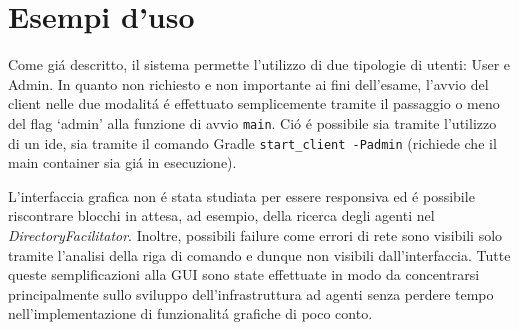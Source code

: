 \section{Esempi d’uso}


Come gi\'a descritto, il sistema permette l'utilizzo di due tipologie di utenti: User e Admin. In quanto non richiesto e non importante ai fini dell'esame, l'avvio del client nelle due modalit\'a \'e effettuato semplicemente tramite il passaggio o meno del flag `admin' alla funzione di avvio \texttt{main}. Ci\'o \'e possibile sia tramite l'utilizzo di un ide, sia tramite il comando Gradle \texttt{start\_client -Padmin} (richiede che il main container sia gi\'a in esecuzione).

L'interfaccia grafica non \'e stata studiata per essere responsiva ed \'e possibile riscontrare blocchi in attesa, ad esempio, della ricerca degli agenti nel \textit{DirectoryFacilitator}. Inoltre, possibili failure come errori di rete sono visibili solo tramite l'analisi della riga di comando e dunque non visibili dall'interfaccia. Tutte queste semplificazioni alla GUI sono state effettuate in modo da concentrarsi principalmente sullo sviluppo dell'infrastruttura ad agenti senza perdere tempo nell'implementazione di funzionalit\'a grafiche di poco conto.

